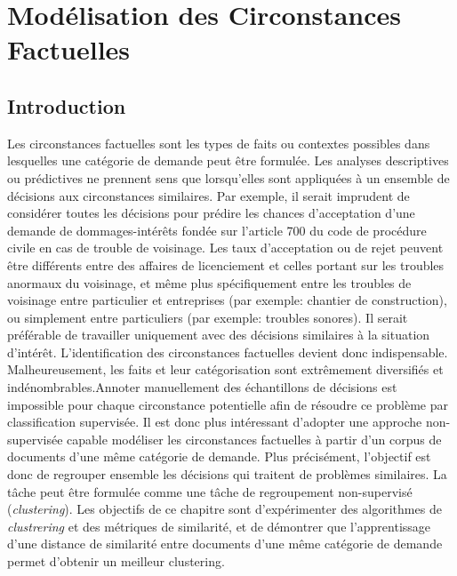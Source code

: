  \chapter{Modélisation des Circonstances Factuelles}
\label{chap:similarite}

% 

\section{Introduction}
\label{sec:similarite:introduction}
Les circonstances factuelles sont les types de faits ou contextes possibles dans lesquelles une catégorie de demande peut être formulée. Les analyses descriptives ou prédictives ne prennent sens que lorsqu'elles sont appliquées à un ensemble de décisions aux circonstances similaires. Par exemple, il serait imprudent de considérer toutes les décisions pour prédire les chances d'acceptation d'une demande de dommages-intérêts fondée sur l'\og article 700 du code de procédure civile \fg{} en cas de trouble de voisinage. Les taux d'acceptation ou de rejet peuvent être différents entre des affaires de licenciement et celles portant sur les troubles anormaux du voisinage, et même plus spécifiquement entre les troubles de voisinage entre particulier et entreprises (par exemple: chantier de construction), ou simplement entre particuliers (par exemple: troubles sonores). Il serait préférable de travailler uniquement avec des décisions similaires à la situation d'intérêt. L'identification des circonstances factuelles devient donc indispensable. Malheureusement, les faits et leur catégorisation sont extrêmement diversifiés et indénombrables.Annoter manuellement des échantillons de décisions est impossible pour chaque circonstance potentielle afin de résoudre ce problème par classification supervisée. Il est donc plus intéressant d'adopter une approche non-supervisée capable modéliser les circonstances factuelles à partir d'un corpus de documents d'une même catégorie de demande. Plus précisément, l’objectif est donc de regrouper ensemble les décisions qui traitent de problèmes similaires. La tâche peut être formulée comme une tâche de regroupement non-supervisé (\textit{clustering}).  Les objectifs de ce chapitre sont d'expérimenter des algorithmes  de \textit{clustrering} et des métriques de similarité, et de démontrer que l'apprentissage d'une distance de similarité entre documents d'une même catégorie de demande permet d'obtenir un meilleur clustering.

